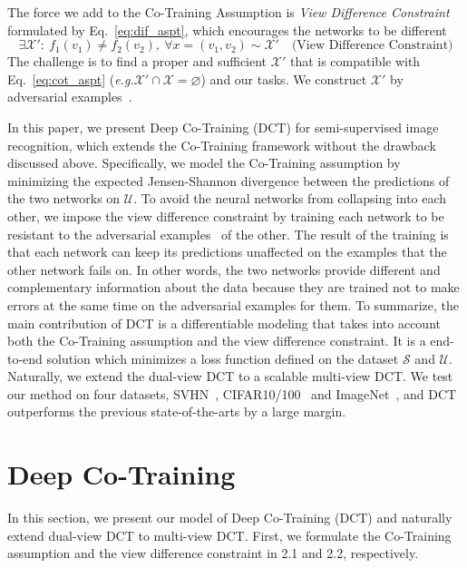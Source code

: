 \documentclass[runningheads]{llncs}
\begin{document}
The force we add to the Co-Training Assumption is \emph{View Difference Constraint} formulated by Eq.~\ref{eq:dif_aspt}, which encourages the networks to be different
\begin{equation}\label{eq:dif_aspt}
  \exists \mathcal{X'}:~f_1(v_1)\neq f_2(v_2),~\forall x = (v_1, v_2)\sim\mathcal{X'} \text{~~~(View Difference Constraint)}
\end{equation}
The challenge is to find a proper and sufficient $\mathcal{X'}$ that is compatible with Eq.~\ref{eq:cot_aspt} (\textit{e.g.}$\mathcal{X'}\cap \mathcal{X}=\varnothing$) and our tasks.
We construct $\mathcal{X}'$ by adversarial examples~\cite{adv}.

In this paper, we present Deep Co-Training (DCT) for semi-supervised image recognition, which extends the Co-Training framework without the drawback discussed above.
Specifically, we model the Co-Training assumption by minimizing the expected Jensen-Shannon divergence between the predictions of the two networks on $\mathcal{U}$.
To avoid the neural networks from collapsing into each other, we impose the view difference constraint by training each network to be resistant to the adversarial examples~\cite{adv,adv2} of the other.
The result of the training is that each network can keep its predictions unaffected on the examples that the other network fails on.
In other words, the two networks provide different and complementary information about the data because they are trained not to make errors at the same time on the adversarial examples for them.
To summarize, the main contribution of DCT is a differentiable modeling that takes into account both the Co-Training assumption and the view difference constraint.
It is a end-to-end solution which minimizes a loss function defined on the dataset $\mathcal{S}$ and $\mathcal{U}$.
Naturally, we extend the dual-view DCT to a scalable multi-view DCT.
We test our method on four datasets, SVHN~\cite{svhn}, CIFAR10/100~\cite{cifar} and ImageNet~\cite{ILSVRC15},
and DCT outperforms the previous state-of-the-arts by a large margin.

\vspace{-0.05in}\section{Deep Co-Training}\vspace{-0.04in}
In this section, we present our model of Deep Co-Training (DCT) and naturally extend dual-view DCT to multi-view DCT.
First, we formulate the Co-Training assumption and  the view difference constraint in 2.1 and 2.2, respectively.
\end{document}
